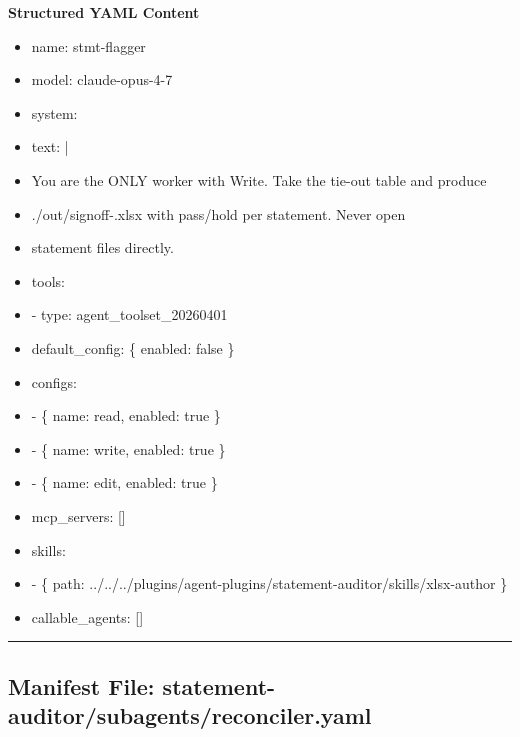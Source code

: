 \documentclass[11pt]{article}
\begin{document}
\textbf{Structured YAML Content}
\begin{itemize}[leftmargin=*,itemsep=2pt,topsep=2pt]
\item {} name: stmt-flagger
\item {} model: claude-opus-4-7
\item {} system:
\item {} text: |
\item {} You are the ONLY worker with Write. Take the tie-out table and produce
\item {} ./out/signoff-.xlsx with pass/hold per statement. Never open
\item {} statement files directly.
\item {} tools:
\item {} - type: agent\_\allowbreak{}toolset\_\allowbreak{}20260401
\item {} default\_\allowbreak{}config: \{ enabled: false \}
\item {} configs:
\item {} - \{ name: read, enabled: true \}
\item {} - \{ name: write, enabled: true \}
\item {} - \{ name: edit, enabled: true \}
\item {} mcp\_\allowbreak{}servers: []
\item {} skills:
\item {} - \{ path: ../../../plugins/agent-plugins/statement-auditor/skills/xlsx-author \}
\item {} callable\_\allowbreak{}agents: []
\end{itemize}

\vspace{0.8em}\hrule\vspace{0.8em}

\subsection{Manifest File: statement-auditor/subagents/reconciler.yaml}\label{file:statement-auditor-subagents-reconciler-yaml}
\end{document}
